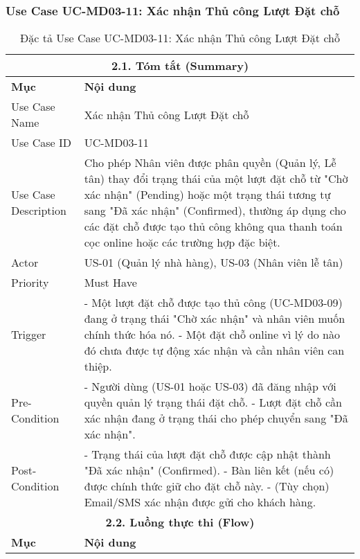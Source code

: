 \subsubsection{Use Case UC-MD03-11: Xác nhận Thủ công Lượt Đặt chỗ}
\begin{longtable}{|m{4cm}|p{11cm}|}
\caption{Đặc tả Use Case UC-MD03-11: Xác nhận Thủ công Lượt Đặt chỗ} \label{tab:uc_md03_11_revised_v3} \\
\hline
\multicolumn{2}{|c|}{\textbf{2.1. Tóm tắt (Summary)}} \\
\hline
\textbf{Mục} & \textbf{Nội dung} \\
\hline
\endhead %
\hline
\endfoot %
\hline
\endlastfoot %
Use Case Name & Xác nhận Thủ công Lượt Đặt chỗ \\
\hline
Use Case ID & UC-MD03-11 \\
\hline
Use Case Description & Cho phép Nhân viên được phân quyền (Quản lý, Lễ tân) thay đổi trạng thái của một lượt đặt chỗ từ "Chờ xác nhận" (Pending) hoặc một trạng thái tương tự sang "Đã xác nhận" (Confirmed), thường áp dụng cho các đặt chỗ được tạo thủ công không qua thanh toán cọc online hoặc các trường hợp đặc biệt. \\
\hline
Actor & US-01 (Quản lý nhà hàng), US-03 (Nhân viên lễ tân) \\
\hline
Priority & Must Have \\
\hline
Trigger & - Một lượt đặt chỗ được tạo thủ công (UC-MD03-09) đang ở trạng thái "Chờ xác nhận" và nhân viên muốn chính thức hóa nó. \newline - Một đặt chỗ online vì lý do nào đó chưa được tự động xác nhận và cần nhân viên can thiệp. \\
\hline
Pre-Condition & - Người dùng (US-01 hoặc US-03) đã đăng nhập với quyền quản lý trạng thái đặt chỗ. \newline - Lượt đặt chỗ cần xác nhận đang ở trạng thái cho phép chuyển sang "Đã xác nhận". \\
\hline
Post-Condition & - Trạng thái của lượt đặt chỗ được cập nhật thành "Đã xác nhận" (Confirmed). \newline - Bàn liên kết (nếu có) được chính thức giữ cho đặt chỗ này. \newline - (Tùy chọn) Email/SMS xác nhận được gửi cho khách hàng. \\
\hline
\multicolumn{2}{|c|}{\textbf{2.2. Luồng thực thi (Flow)}} \\
\hline
\textbf{Mục} & \textbf{Nội dung} \\

\end{longtable}
